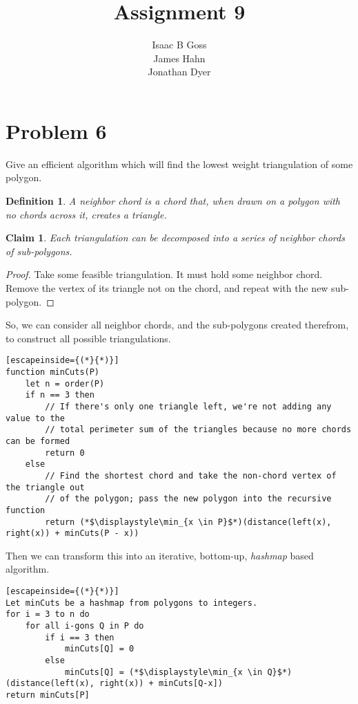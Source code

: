 \documentclass{article}
\author{Isaac B Goss\\ James Hahn\\ Jonathan Dyer}
\title{Assignment 9}
\newtheorem{thm}{Claim}
\newtheorem{defn}{Definition}
\providecommand{\prob}[1]{\section*{Problem #1}}
\begin{document}
\maketitle

    \prob{6}
    Give an efficient algorithm which will find the lowest weight triangulation of some polygon.
    \begin{defn}
        A neighbor chord is a chord that, when drawn on a polygon with no chords across it, creates a triangle.
    \end{defn}

    \begin{thm}
        Each triangulation can be decomposed into a series of neighbor chords of sub-polygons.
    \end{thm}
    \begin{proof}
        Take some feasible triangulation.
        It must hold some neighbor chord.
        Remove the vertex of its triangle not on the chord, and repeat with the new sub-polygon. 
    \end{proof}
    
    So, we can consider all neighbor chords, and the sub-polygons created therefrom, to construct all possible triangulations.
    
    \begin{lstlisting}[escapeinside={(*}{*)}]
function minCuts(P)
    let n = order(P)
    if n == 3 then
    	// If there's only one triangle left, we're not adding any value to the
    	// total perimeter sum of the triangles because no more chords can be formed
        return 0
    else
    	// Find the shortest chord and take the non-chord vertex of the triangle out 
    	// of the polygon; pass the new polygon into the recursive function
        return (*$\displaystyle\min_{x \in P}$*)(distance(left(x), right(x)) + minCuts(P - x)) 
    \end{lstlisting}
    
    Then we can transform this into an iterative, bottom-up, \emph{hashmap} based algorithm.
    
    \begin{lstlisting}[escapeinside={(*}{*)}]
Let minCuts be a hashmap from polygons to integers.
for i = 3 to n do
    for all i-gons Q in P do
        if i == 3 then
            minCuts[Q] = 0
        else
            minCuts[Q] = (*$\displaystyle\min_{x \in Q}$*)(distance(left(x), right(x)) + minCuts[Q-x])
return minCuts[P]
    \end{lstlisting}
    
\end{document}
